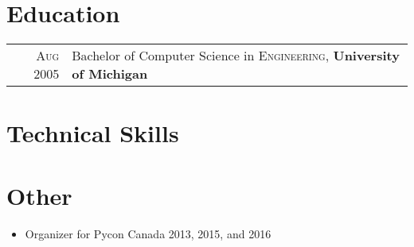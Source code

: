 \documentclass[a4paper,10pt]{article}
\begin{document}
    
        \section{Education}
        \begin{tabular}{rl}
        \textsc{Aug} 2005 & Bachelor of Computer Science in \textsc{Engineering}, \textbf{University of Michigan}\\
        \end{tabular}
    

    
        \section{Technical Skills}
              \newline
            
          

    
    \section {Other}
    \begin{itemize}
        \item Organizer for Pycon Canada 2013, 2015, and 2016
    \end{itemize}
    
\end{document}
